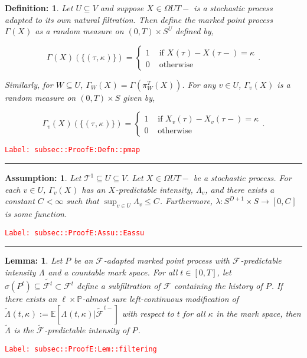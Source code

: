 \documentclass[12pt]{article}
\newcommand{\mb}{\mathbb}
\newcommand{\mc}{\mathcal}
\newcommand{\ra}{\rightarrow}
\newcommand{\te}{\text}
\newcommand{\tr}{\textcolor{red}}
\newcommand{\labe}[1]{\tr{\texttt{Label: #1}}}
\newcommand{\lin}{\rule{\linewidth}{0.4 pt}}
\newcommand{\pr}{\mb{P}}							%
\newcommand{\ex}[1]{\mb{E}\left[#1\right]}			%
\renewcommand{\v}{v}							%
\renewcommand{\U}{U}							%
\newcommand{\UU}{W}								%
\renewcommand{\S}{S}							%
\newcommand{\T}{T}								%
\renewcommand{\t}{t}							%
\newcommand{\degr}{D}								%
\newcommand{\pup}[1]{^{#1}}							%
\newcommand{\tree}{\mc{T}}							%
\newcommand{\V}{V}									%
\newcommand{\rt}[1]{\tau^{#1}}						%
\newcommand{\piV}[2]{\pi_{#1}^{#2}}					%
\newcommand{\rxvt}[2]{X_{#1}{(#2)}}					%
\newcommand{\rxvts}[2]{X_{#1}{#2}}					%
\newcommand{\rp}[1]{P^{#1}}							%
\newcommand{\ratee}[1]{\Lambda_{#1}}				%
\newcommand{\cratee}[2]{\alt{\Lambda}_{#1}^{#2}} 	%
\newcommand{\F}[2]{\mc{F}_{#1}^{#2}}				%
\newcommand{\const}[1]{C_{#1}}						%
\newcommand{\Sm}{\ell}								%
\newcommand{\alt}{\widetilde}						%
\renewcommand{\mark}[1]{\kappa^{#1}}				%
\newcommand{\pmap}[1]{\Gamma_{#1}}				%
\newtheorem{lem}[thms]{Lemma: }
\newtheorem{defn}[thms]{Definition: }
\newtheorem{assu}[thms]{Assumption: }
\begin{document}
\begin{defn}
Let \(\U\subseteq \V\) and suppose \(\rxvts{}{} \in \Omega{\U}{\T-}\) is a stochastic process adapted to its own natural filtration. Then define the marked point process \(\pmap{}(\rxvts{}{})\) as a random measure on \((0,\T) \times \S^\U\) defined by,

\[\pmap{}(\rxvts{}{})(\{(\rt{},\mark{})\}) = \begin{cases}
1 &\te{ if } \rxvt{}{\rt{}} - \rxvt{}{\rt{}-} = \mark{}\\
0 &\te{ otherwise}
\end{cases}.\]

Similarly, for \(\UU \subseteq \U\), \(\pmap{\UU}(\rxvts{}{}) = \pmap{}\left(\piV{\UU}{\T}(\rxvts{}{})\right)\). For any \(\v\in \U\), \(\pmap{\v}(\rxvts{}{})\) is a random measure on \((0,\T) \times \S\) given by,

\[\pmap{\v}(\rxvts{}{})(\{(\rt{},\mark{})\}) = \begin{cases}
1 &\te{ if } \rxvt{\v}{\rt{}} - \rxvt{\v}{\rt{}-} = \mark{}\\
0 &\te{ otherwise}
\end{cases}.\]
\label{subsec::ProofE:Defn::pmap}
\end{defn}
\labe{subsec::ProofE:Defn::pmap}

\lin

\begin{assu}
Let \(\tree\pup{1}\subseteq\U \subseteq \V\). Let \(\rxvts{}{}\in \Omega{\U}{\T-}\) be a stochastic process. For each \(\v\in \U\), \(\pmap{\v}(\rxvts{}{})\) has an \(\rxvts{}{}\)-predictable intensity, \(\ratee{\v}\), and there exists a constant \(\const{} < \infty\) such that \(\sup_{\v\in\U} \ratee{\v} \leq \const{}\). Furthermore, \(\lambda: \S^{\degr+1}\times \S\ra[0,\const{}]\) is some function.
\label{subsec::ProofE:Assu::Eassu}
\end{assu}
\labe{subsec::ProofE:Assu::Eassu}

\lin

\begin{lem}
Let \(\rp{}\) be an \(\F{}{}\)-adapted marked point process with \(\F{}{}\)-predictable intensity \(\ratee{}\) and a countable mark space. For all \(\t \in [0,\T]\), let \(\sigma(\rp{\t}) \subseteq \alt{\F{}{\t}}\subset \F{}{\t}\) define a subfiltration of \(\F{}{}\) containing the history of \(\rp{}\). If there exists an \(\Sm\times \pr\)-almost sure left-continuous modification of \(\cratee{}{}(\t,\mark{}) := \ex{\ratee{}(\t,\mark{})|\alt{\F{}{}}^{\t-}}\) with respect to \(\t\) for all \(\mark{}\) in the mark space, then \(\cratee{}{}\) is the \(\alt{\F{}{}}\)-predictable intensity of \(\rp{}\).
\label{subsec::ProofE:Lem::filtering}
\end{lem}
\labe{subsec::ProofE:Lem::filtering}
\end{document}
